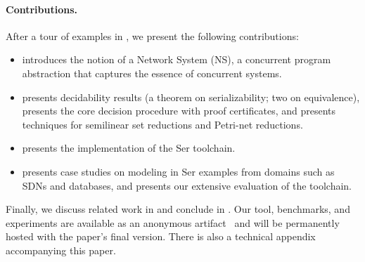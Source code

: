 \paragraph{Contributions.}
After a tour of examples in , we present the following contributions:
\begin{itemize}
    \item {} introduces the notion of a Network System (NS), a concurrent program abstraction that captures the essence of concurrent systems.
    \item {} presents decidability results (a theorem on serializability; two on equivalence), presents the core decision procedure with proof certificates, and presents techniques for semilinear set reductions and Petri-net reductions.
    \item {} presents the implementation of the Ser toolchain.
    \item {} presents case studies on modeling in Ser examples from domains such as SDNs and databases, and presents our extensive evaluation of the toolchain.
\end{itemize}


Finally, we discuss related work in  and conclude in .
Our tool, benchmarks, and experiments are available as an anonymous artifact~\cite{ArtifactRepository} and will be permanently hosted with the paper’s final version. There is also a technical appendix accompanying this paper.